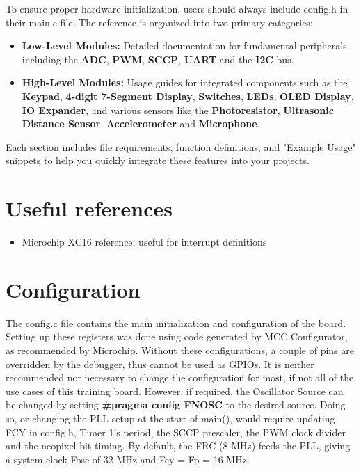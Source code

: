 \documentclass[
  11pt,
  letterpaper,
  oneside,
  DIV=13,               %
  parskip=half,          %
  headings=normal,
  chapterprefix=false,
  toc=listof,
  numbers=noenddot,
]{scrbook}
\begin{document}
To ensure proper hardware initialization, users should always include config.h in their main.c file. The reference is organized into two primary categories:
\begin{itemize}
\item \textbf{Low-Level Modules:} Detailed documentation for fundamental peripherals including the \textbf{ADC}, \textbf{PWM}, \textbf{SCCP}, \textbf{UART} and the \textbf{I2C} bus.
\item \textbf{High-Level Modules:} Usage guides for integrated components such as the \textbf{Keypad}, \textbf{4-digit 7-Segment Display}, \textbf{Switches}, \textbf{LEDs}, \textbf{OLED Display}, \textbf{IO Expander}, and various sensors like the \textbf{Photoresistor}, \textbf{Ultrasonic Distance Sensor}, \textbf{Accelerometer} and \textbf{Microphone}.
\end{itemize}

Each section includes file requirements, function definitions, and "Example Usage" snippets to help you quickly integrate these features into your projects.

\chapter{Useful references}
\begin{itemize}
\item Microchip XC16 reference: useful for interrupt definitions
\end{itemize}

\chapter{Configuration}

The config.c file contains the main initialization and configuration of the board. Setting up these registers was done using code generated by MCC Configurator, as recommended by Microchip. Without these configurations, a couple of pins are overridden by the debugger, thus cannot be used as GPIOs. It is neither recommended nor necessary to change the configuration for most, if not all of the use cases of this training board. However, if required, the Oscillator Source can be changed by setting \textbf{\#pragma config FNOSC} to the desired source. Doing so, or changing the PLL setup at the start of main(), would require updating FCY in config.h, Timer 1's period, the SCCP prescaler, the PWM clock divider and the neopixel bit timing. By default, the FRC (8 MHz) feeds the PLL, giving a system clock Fosc of 32 MHz and Fcy = Fp = 16 MHz.
\end{document}
